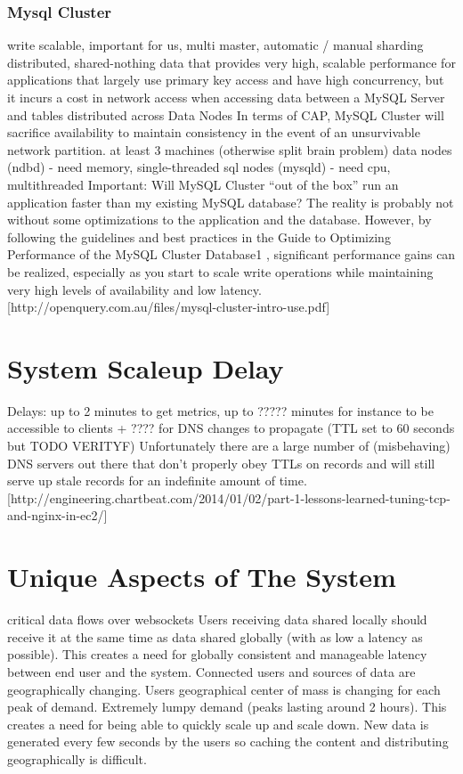 \documentclass{uvamscse}
\begin{document}
\subsubsection{Mysql Cluster}
write scalable, important for us, multi master, automatic / manual sharding
distributed, shared-nothing data that provides very high, scalable performance for applications that largely use primary key access and have high concurrency, but it incurs a cost in network access when accessing data between a MySQL Server and tables distributed across Data Nodes
In terms of CAP, MySQL Cluster will sacrifice availability to maintain consistency in the event of an unsurvivable network partition.
at least 3 machines (otherwise split brain problem)
data nodes (ndbd) - need memory, single-threaded
sql nodes (mysqld) - need cpu, multithreaded
Important:
Will MySQL Cluster “out of the box” run an application faster than my existing MySQL database?
The reality is probably not without some optimizations to the application and the database. However, by following the guidelines and best practices in the Guide to Optimizing Performance of the MySQL Cluster Database1 , significant performance gains can be realized, especially as you start to scale write operations while maintaining very high levels of availability and low latency.
[http://openquery.com.au/files/mysql-cluster-intro-use.pdf]


\section{System Scaleup Delay}
Delays: up to 2 minutes to get metrics, up to ????? minutes for instance to be accessible to clients + ???? for DNS changes to propagate (TTL set to 60 seconds but TODO VERITYF)
Unfortunately there are a large number of (misbehaving) DNS servers out there that don’t properly obey TTLs on records and will still serve up stale records for an indefinite amount of time. [http://engineering.chartbeat.com/2014/01/02/part-1-lessons-learned-tuning-tcp-and-nginx-in-ec2/]

\section{Unique Aspects of The System}
critical data flows over websockets
Users receiving data shared locally should receive it at the same time as data shared globally (with as low a latency as possible). This creates a need for globally consistent and manageable latency between end user and the system.
Connected users and sources of data are geographically changing.
Users geographical center of mass is changing for each peak of demand.
Extremely lumpy demand (peaks lasting around 2 hours). This creates a need for being able to quickly scale up and scale down.
New data is generated every few seconds by the users so caching the content and distributing geographically is difficult.
\end{document}

